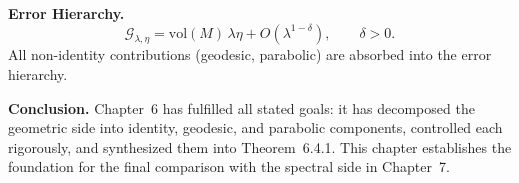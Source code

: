 \medskip

\noindent\textbf{Error Hierarchy.}
\[
  \mathcal{G}_{\lambda,\eta}
  = \mathrm{vol}(M)\,\lambda\eta
  + O(\lambda^{1-\delta}), \qquad \delta>0.
\]
All non-identity contributions (geodesic, parabolic) are absorbed into the error hierarchy.

\medskip

\noindent\textbf{Conclusion.}
Chapter~6 has fulfilled all stated goals:
it has decomposed the geometric side into identity, geodesic, and parabolic components,
controlled each rigorously, and synthesized them into Theorem~6.4.1.
This chapter establishes the foundation for the final comparison with the spectral side in Chapter~7.

